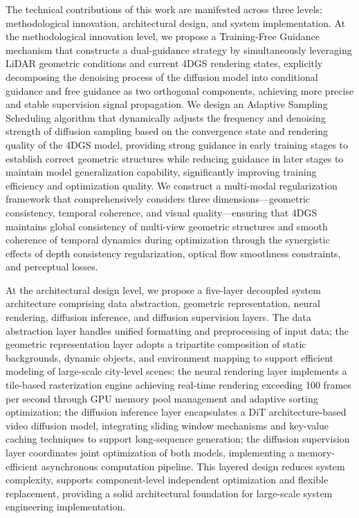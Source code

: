 \begin{abstract*}
  The technical contributions of this work are manifested across three levels: methodological innovation, architectural design, and system implementation. At the methodological innovation level, we propose a Training-Free Guidance mechanism that constructs a dual-guidance strategy by simultaneously leveraging LiDAR geometric conditions and current 4DGS rendering states, explicitly decomposing the denoising process of the diffusion model into conditional guidance and free guidance as two orthogonal components, achieving more precise and stable supervision signal propagation. We design an Adaptive Sampling Scheduling algorithm that dynamically adjusts the frequency and denoising strength of diffusion sampling based on the convergence state and rendering quality of the 4DGS model, providing strong guidance in early training stages to establish correct geometric structures while reducing guidance in later stages to maintain model generalization capability, significantly improving training efficiency and optimization quality. We construct a multi-modal regularization framework that comprehensively considers three dimensions—geometric consistency, temporal coherence, and visual quality—ensuring that 4DGS maintains global consistency of multi-view geometric structures and smooth coherence of temporal dynamics during optimization through the synergistic effects of depth consistency regularization, optical flow smoothness constraints, and perceptual losses.

  At the architectural design level, we propose a five-layer decoupled system architecture comprising data abstraction, geometric representation, neural rendering, diffusion inference, and diffusion supervision layers. The data abstraction layer handles unified formatting and preprocessing of input data; the geometric representation layer adopts a tripartite composition of static backgrounds, dynamic objects, and environment mapping to support efficient modeling of large-scale city-level scenes; the neural rendering layer implements a tile-based rasterization engine achieving real-time rendering exceeding 100 frames per second through GPU memory pool management and adaptive sorting optimization; the diffusion inference layer encapsulates a DiT architecture-based video diffusion model, integrating sliding window mechanisms and key-value caching techniques to support long-sequence generation; the diffusion supervision layer coordinates joint optimization of both models, implementing a memory-efficient asynchronous computation pipeline. This layered design reduces system complexity, supports component-level independent optimization and flexible replacement, providing a solid architectural foundation for large-scale system engineering implementation.


\end{abstract*}
